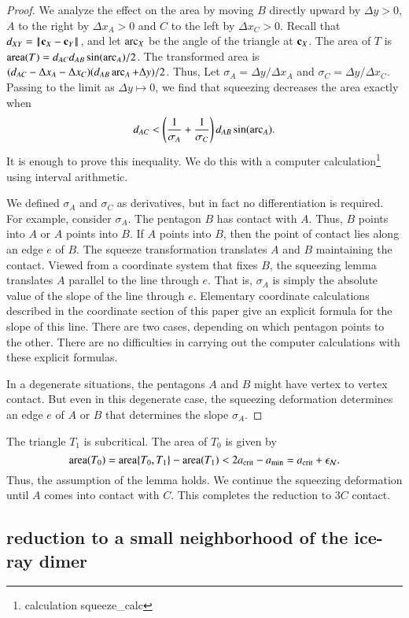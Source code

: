 \begin{proof}  
  We analyze the effect on the area by moving $B$ directly upward by
  $\Delta y >0$, $A$ to the right by $\Delta x_A >0$ and $C$ to the
  left by $\Delta x_C >0$.  Recall that $\dx{XY} = \dd{X}{Y}$, and let
  $\operatorname{arc}_X$ be the angle of the triangle at ${\mathbf c}_X$.  The area of $T$ is
  ${\operatorname{area}}(T) = d_{AC} d_{AB} \sin(\operatorname{arc}_A)/2$.  The transformed area is
  $(d_{AC}-\Delta x_A - \Delta x_C)(d_{AB}\operatorname{arc}_A + \Delta y)/2$.
  Thus, Let $\sigma_A = \Delta y/\Delta x_A$ and $\sigma_C = \Delta y
  /\Delta x_C$.  Passing to the limit as $\Delta y \mapsto 0$, we find
  that squeezing decreases the area exactly when
\[
d_{AC} < \left(\frac{1}{\sigma_A}+\frac{1}{\sigma_C}\right)d_{AB}\sin(\operatorname{arc}_A).
\]
It is enough to prove this inequality.  We do this with a computer
calculation\footnote{calculation squeeze\_calc} using interval
arithmetic.

We defined $\sigma_A$ and $\sigma_C$ as derivatives, but in fact no
differentiation is required.  For example, consider $\sigma_A$.  The
pentagon $B$ has contact with $A$.  Thus, $B$ points into $A$ or $A$
points into $B$.  If $A$ points into $B$, then the point of contact
lies along an edge $e$ of $B$.  The squeeze transformation translates
$A$ and $B$ maintaining the contact.  Viewed from a coordinate system
that fixes $B$, the squeezing lemma translates $A$ parallel to the
line through $e$.  That is, $\sigma_A$ is simply the absolute value of
the slope of the line through $e$.  Elementary coordinate calculations
described in the coordinate section of this paper give an explicit
formula for the slope of this line.  There are two cases, depending on
which pentagon points to the other.  There are no difficulties in
carrying out the computer calculations with these explicit formulas.

In a degenerate situations, the pentagons $A$ and $B$ might have
vertex to vertex contact. But even in this degenerate case, the
squeezing deformation determines an edge $e$ of $A$ or $B$ that
determines the slope $\sigma_A$.
\end{proof}

The triangle $T_1$ is subcritical.  The area of $T_0$ is given by
\[
{\operatorname{area}}(T_0) = {\operatorname{area}}\{T_0,T_1\} - {\operatorname{area}}(T_1) 
< 2a_\text{crit} - a_\text{min} = a_\text{crit}+\epsilon_{\mathcal N}.
\]
Thus, the assumption of the lemma holds.  We continue the squeezing
deformation until $A$ comes into contact with $C$.  This completes the
reduction to $3C$ contact.


\subsection{reduction to a small neighborhood of the ice-ray dimer}\label{sec:nbd}

